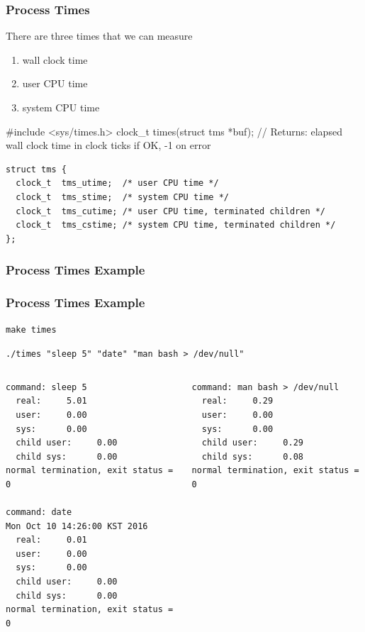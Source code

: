 \documentclass[newPxFont,sthlmFooter,nooffset]{beamer}
\begin{document}
\begin{frame}
  \frametitle{Process Times}

There are three times that we can measure
\begin{enumerate}
\item \footnotesize wall clock time
\item \footnotesize user CPU time
\item \footnotesize system CPU time
\end{enumerate}

\begin{codedef}
#include <sys/times.h>
clock\_t times(struct tms *buf);
// Returns: elapsed wall clock time in clock ticks if OK, -1 on error
\end{codedef}

\begin{verbatim}
struct tms {
  clock_t  tms_utime;  /* user CPU time */
  clock_t  tms_stime;  /* system CPU time */
  clock_t  tms_cutime; /* user CPU time, terminated children */
  clock_t  tms_cstime; /* system CPU time, terminated children */
};
\end{verbatim}


\end{frame}


\begin{frame}
  \frametitle{Process Times Example }


\end{frame}

\begin{frame}[fragile,t]
  \frametitle{Process Times Example}

\lstset{basicstyle=\footnotesize, numbers=none, lineskip=0pt}
\texttt{make times}

\texttt{./times "sleep 5" "date" "man bash > /dev/null"}
\vspace{-2em}
\begin{columns}[t]
  \begin{column}{0.45\linewidth}
\begin{lstlisting}
command: sleep 5
  real:     5.01
  user:     0.00
  sys:      0.00
  child user:     0.00
  child sys:      0.00
normal termination, exit status = 0

command: date
Mon Oct 10 14:26:00 KST 2016
  real:     0.01
  user:     0.00
  sys:      0.00
  child user:     0.00
  child sys:      0.00
normal termination, exit status = 0
\end{lstlisting}
  \end{column}
  \begin{column}{0.45\linewidth}
\begin{lstlisting}
command: man bash > /dev/null
  real:     0.29
  user:     0.00
  sys:      0.00
  child user:     0.29
  child sys:      0.08
normal termination, exit status = 0
\end{lstlisting}
  \end{column}
\end{columns}

\end{frame}
\end{document}
